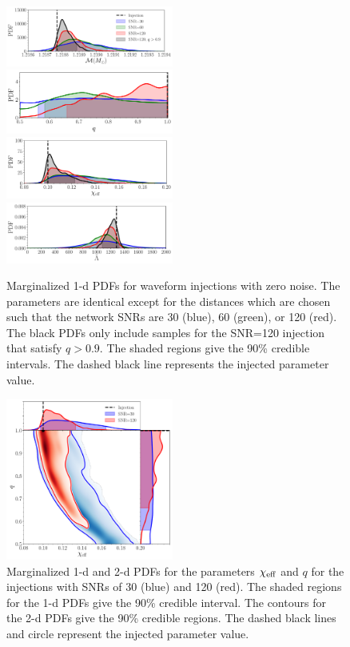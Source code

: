 \documentclass[prd,aps,letter,twocolumn,floatfix,notitlepage,nofootinbib]{revtex4-1}
\begin{document}
\begin{figure}[htb]
\centering
\includegraphics[width=0.49\textwidth]{chirpmass.pdf}\\
\includegraphics[width=0.49\textwidth]{q.pdf}\\
\includegraphics[width=0.49\textwidth]{chieff.pdf}\\
\includegraphics[width=0.49\textwidth]{tildelambda.pdf}
\caption{Marginalized 1-d PDFs for waveform injections with zero noise. The parameters are identical except for the distances which are chosen such that the network SNRs are 30 (blue), 60 (green), or 120 (red). The black PDFs only include samples for the SNR=120 injection that satisfy $q>0.9$. The shaded regions give the 90\% credible intervals. The dashed black line represents the injected parameter value.}
\label{fig:1dpe}
\end{figure}

\begin{figure}[htb]
\centering
\includegraphics[width=0.49\textwidth]{chieff_q.pdf}
\caption{Marginalized 1-d and 2-d PDFs for the parameters $\chi_{\rm eff}$ and $q$ for the injections with SNRs of 30 (blue) and 120 (red). The shaded regions for the 1-d PDFs give the 90\% credible interval. The contours for the 2-d PDFs give the 90\% credible regions. The dashed black lines and circle represent the injected parameter value.}
\label{fig:2dpe}
\end{figure}
\end{document}
